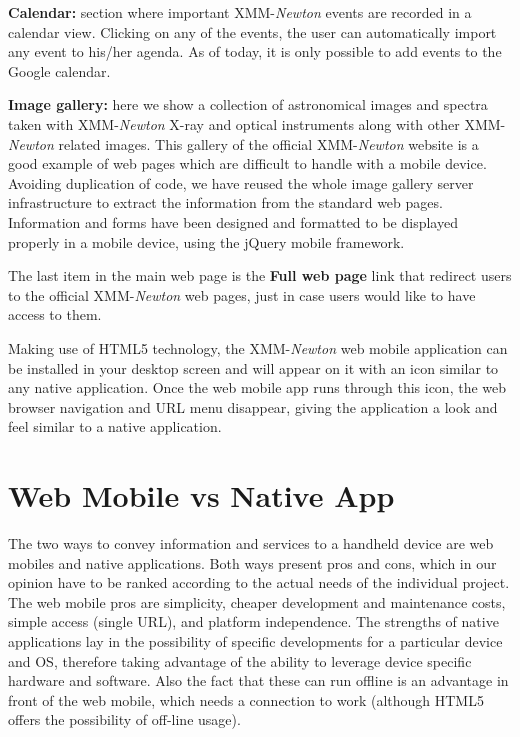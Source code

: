 {\bf Calendar:} section where important XMM-{\em Newton} events are recorded in a calendar view. Clicking on any of the events, the user can automatically import any event to his/her agenda. As of today, it is only possible to add events to the Google calendar.

{\bf Image gallery:} here we show a collection of astronomical images and spectra taken with XMM-{\em Newton} X-ray and optical instruments along with other XMM-{\em Newton} related images. This gallery of the official XMM-{\em Newton} website is a good example of web pages which are difficult to handle with a mobile device. Avoiding duplication of code, we have reused the whole image gallery server infrastructure to extract the information from the standard web pages.  Information and forms have been designed and formatted to be displayed properly in a mobile device, using the jQuery mobile framework.

The last item in the main web page is the {\bf Full web page} link that redirect users to the official XMM-{\em Newton} web pages, just in case users would like to have access to them.

Making use of HTML5 technology, the XMM-{\em Newton} web mobile application can be installed in your desktop screen and will appear on it with an icon similar to any native application. Once the web mobile app runs through this icon, the web browser navigation and URL menu disappear, giving the application a look and feel similar to a native application.

\section{Web Mobile vs Native App}

The two ways to convey information and services to a handheld device are web mobiles and native applications. Both ways present pros and cons, which in our opinion have to be ranked according to the actual needs of the individual project. The web mobile pros are simplicity, cheaper development and maintenance costs, simple access (single URL), and platform independence. The strengths of native applications lay in the possibility of specific developments for a particular device and OS, therefore taking advantage of the ability to leverage device specific hardware and software. Also the fact that these can run offline is an advantage in front of the web mobile, which needs a connection to work (although HTML5 offers the possibility of off-line usage).

